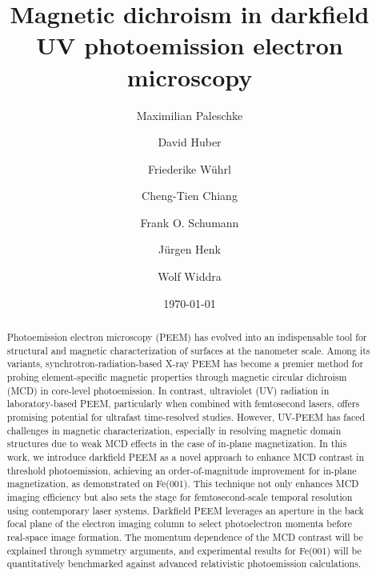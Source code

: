 \documentclass[prl,twocolumn,floatfix,superscriptaddress,aps]{revtex4-2}
\begin{document}
\title{Magnetic dichroism in darkfield UV photoemission electron microscopy}
\author{Maximilian Paleschke}
\author{David Huber}
\author{Friederike Wührl}

\author{Cheng-Tien Chiang}

\author{Frank O. Schumann}

\author{Jürgen Henk}
\author{Wolf Widdra}


\date{\today}

\begin{abstract}
    Photoemission electron microscopy (PEEM) has evolved into an indispensable tool for structural and magnetic characterization of surfaces at the nanometer scale. Among its variants, synchrotron-radiation-based X-ray PEEM has become a premier method for probing element-specific magnetic properties through magnetic circular dichroism (MCD) in core-level photoemission. In contrast, ultraviolet (UV) radiation in laboratory-based PEEM, particularly when combined with femtosecond lasers, offers promising potential for ultrafast time-resolved studies. However, UV-PEEM has faced challenges in magnetic characterization, especially in resolving magnetic domain structures due to weak MCD effects in the case of in-plane magnetization. In this work, we introduce darkfield PEEM as a novel approach to enhance MCD contrast in threshold photoemission, achieving an order-of-magnitude improvement for in-plane magnetization, as demonstrated on Fe(001). This technique not only enhances MCD imaging efficiency but also sets the stage for femtosecond-scale temporal resolution using contemporary laser systems. Darkfield PEEM leverages an aperture in the back focal plane of the electron imaging column to select photoelectron momenta before real-space image formation. The momentum dependence of the MCD contrast will be explained through symmetry arguments, and experimental results for Fe(001) will be quantitatively benchmarked against advanced relativistic photoemission calculations.
\end{abstract}

\pacs{}
\end{document}
